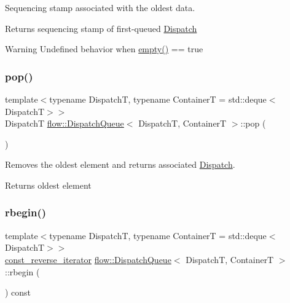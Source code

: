 Sequencing stamp associated with the oldest data. 

\begin{DoxyReturn}{Returns}
sequencing stamp of first-\/queued \hyperlink{classflow_1_1_dispatch}{Dispatch}
\end{DoxyReturn}
\begin{DoxyWarning}{Warning}
Undefined behavior when {\ttfamily \hyperlink{classflow_1_1_dispatch_queue_a447412abd83540a6c595dd7a17116c6c}{empty()} == true} 
\end{DoxyWarning}
\mbox{\label{classflow_1_1_dispatch_queue_a10607f6122683a4e24b44daaf8bf51fe}} 
\subsubsection{\texorpdfstring{pop()}{pop()}}
{\footnotesize\ttfamily template$<$typename DispatchT, typename ContainerT = std\+::deque$<$\+Dispatch\+T$>$$>$ \\
DispatchT \hyperlink{classflow_1_1_dispatch_queue}{flow\+::\+Dispatch\+Queue}$<$ DispatchT, ContainerT $>$\+::pop (\begin{DoxyParamCaption}{ }\end{DoxyParamCaption})\hspace{0.3cm}{\ttfamily [inline]}}



Removes the oldest element and returns associated \hyperlink{classflow_1_1_dispatch}{Dispatch}. 

\begin{DoxyReturn}{Returns}
oldest element 
\end{DoxyReturn}
\mbox{\label{classflow_1_1_dispatch_queue_a969fdabec571725b903056d69ea2a31b}} 
\subsubsection{\texorpdfstring{rbegin()}{rbegin()}}
{\footnotesize\ttfamily template$<$typename DispatchT, typename ContainerT = std\+::deque$<$\+Dispatch\+T$>$$>$ \\
\hyperlink{classflow_1_1_dispatch_queue_ac74f1a9a8d77b06e9576492df2a50e4f}{const\+\_\+reverse\+\_\+iterator} \hyperlink{classflow_1_1_dispatch_queue}{flow\+::\+Dispatch\+Queue}$<$ DispatchT, ContainerT $>$\+::rbegin (\begin{DoxyParamCaption}{ }\end{DoxyParamCaption}) const\hspace{0.3cm}{\ttfamily [inline]}}



